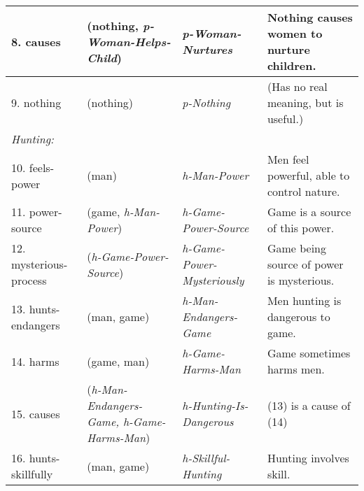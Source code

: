\documentclass[12pt,xcolor=svgnames]{beamer}
\begin{document}
\begin{frame}
{{\begin{tabular}{llll}
\hline 8. causes &\hspace{-3ex} (nothing, {\em p-Woman-Helps-Child}) &\hspace{-3ex}  \em p-Woman-Nurtures &\hspace{-3ex} Nothing causes women to nurture children. \\
\hline 9. nothing &\hspace{-3ex} (nothing) &\hspace{-3ex}  \em p-Nothing  &\hspace{-3ex} (Has no real meaning, but is useful.) \\
\hline\hline \em Hunting: \\
\hline 10. feels-power &\hspace{-3ex} (man) &\hspace{-3ex}  \em h-Man-Power &\hspace{-3ex} Men feel powerful, able to control nature. \\
\hline 11. power-source &\hspace{-3ex} (game, {\em h-Man-Power}) &\hspace{-3ex}  \em h-Game-Power-Source &\hspace{-3ex} Game is a source of this power. \\
\hline 12. mysterious-process &\hspace{-3ex} ({\em h-Game-Power-Source}) &\hspace{-3ex}  \em h-Game-Power-Mysteriously &\hspace{-3ex} Game being source of power is mysterious. \\
\hline 13. hunts-endangers &\hspace{-3ex} (man, game) &\hspace{-3ex}  \em h-Man-Endangers-Game &\hspace{-3ex} Men hunting is dangerous to game. \\
\hline 14. harms &\hspace{-3ex} (game, man) &\hspace{-3ex}  \em h-Game-Harms-Man &\hspace{-3ex} Game sometimes harms men. \\
\hline 15. causes &\hspace{-3ex} ({\em h-Man-Endangers-Game, h-Game-Harms-Man}) &\hspace{-3ex}  \em h-Hunting-Is-Dangerous &\hspace{-3ex} (13) is a cause of (14) \\
\hline 16. hunts-skillfully &\hspace{-3ex} (man, game) &\hspace{-3ex}  \em h-Skillful-Hunting &\hspace{-3ex} Hunting involves skill. \\

\end{tabular}}}
\end{frame}
\end{document}
